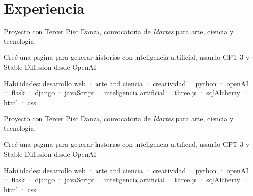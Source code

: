 \documentclass[]{plushcv}
\begin{document}
\begin{minipage}[t]{0.70\textwidth} 



\section{Experiencia}
\vspace{\topsep} %
\begin{tightemize}
\sectionsep
\item Proyecto con Tercer Piso Danza, convocatoria de \emph{Idartes} para arte, ciencia y tecnología.
\item Creé una página para generar historias con inteligencia artificial, usando GPT-3 y Stable Diffusion desde OpenAI 
\item Habilidades: desarrollo web · arte and ciencia · creatividad · python · openAI · flask · django · javaScript  · inteligencia artificial  · three.js  ·  sqlAlchemy · html · css%
\end{tightemize}
\sectionsep



\vspace{\topsep} %
\begin{tightemize}
\sectionsep
\item Proyecto con Tercer Piso Danza, convocatoria de \emph{Idartes} para arte, ciencia y tecnología.
\item Creé una página para generar historias con inteligencia artificial, usando GPT-3 y Stable Diffusion desde OpenAI 
\item Habilidades: desarrollo web · arte and ciencia · creatividad · python · openAI · flask · django · javaScript  · inteligencia artificial  · three.js  ·  sqlAlchemy · html · css%
\end{tightemize}
\sectionsep


\end{minipage}
\end{document}
